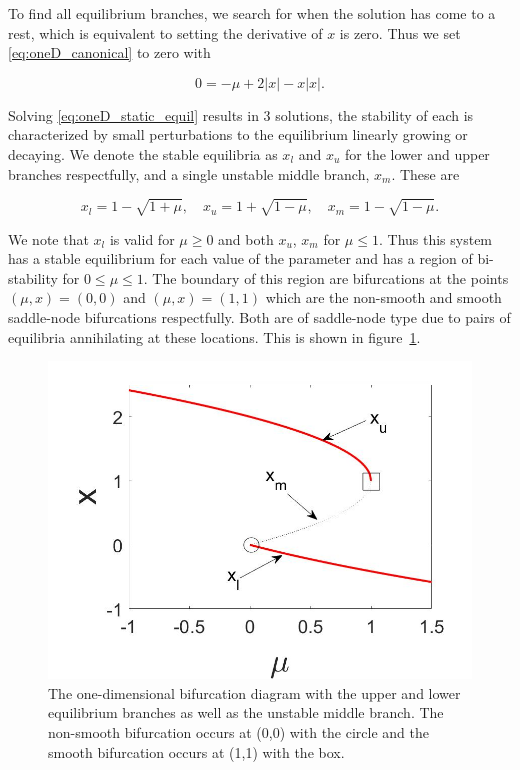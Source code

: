 To find all equilibrium branches, we search for when the solution has come to a rest, which is equivalent to setting the derivative of $x$ is zero. Thus we set \eqref{eq:oneD_canonical} to zero with

\begin{equation}\label{eq:oneD_static_equil}
0=-\mu +2|x|-x|x|.
\end{equation}

Solving \eqref{eq:oneD_static_equil} results in 3 solutions, the stability of each is characterized by small perturbations to the equilibrium linearly growing or decaying. We denote the stable equilibria as $x_l$ and $x_u$ for the lower and upper branches respectfully, and a single unstable middle branch, $x_{m}$. These are

\begin{equation*}
x_l=1-\sqrt{1+\mu},\quad x_u=1+\sqrt{1-\mu},\quad
x_{m}=1-\sqrt{1-\mu}.
\end{equation*}

We note that $x_l$ is valid for $\mu\ge 0$ and both $x_u$, $x_{m}$ for $\mu\le 1$. Thus this system has a stable equilibrium for each value of the parameter and has a region of bi-stability for $0\le \mu\le 1$. The boundary of this region are bifurcations at the points ${(\mu,x)=(0,0)}$ and $(\mu,x)=(1,1)$ which are the non-smooth and smooth saddle-node bifurcations respectfully. Both are of saddle-node type due to pairs of equilibria annihilating at these locations. This is shown in figure~\ref{fig:oneD_static_bifdiagram}.

\begin{figure}[H]
\centering
\includegraphics[width=.8\textwidth]{oneD/bif_diagram.jpg}
\caption{The one-dimensional bifurcation diagram with the upper and lower equilibrium branches as well as the unstable middle branch. The non-smooth bifurcation occurs at (0,0) with the circle and the smooth bifurcation occurs at (1,1) with the box. }
\label{fig:oneD_static_bifdiagram}
\end{figure}


